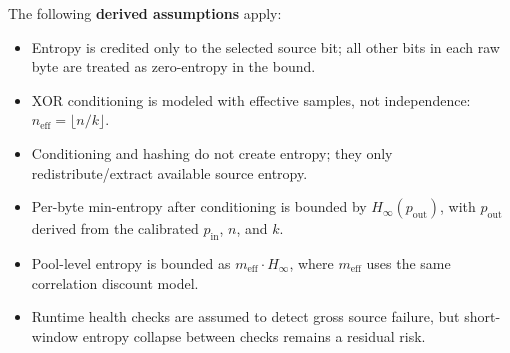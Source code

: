 \documentclass[titlepage]{report}
\begin{document}
		The following \textbf{derived assumptions} apply:
		\begin{itemize}
			\item Entropy is credited only to the selected source bit; all other bits in each raw byte are treated as zero-entropy in the bound.
			\item XOR conditioning is modeled with effective samples, not independence: \(n_{\mathrm{eff}}=\lfloor n/k \rfloor\).
			\item Conditioning and hashing do not create entropy; they only redistribute/extract available source entropy.
			\item Per-byte min-entropy after conditioning is bounded by \(H_\infty(p_{\mathrm{out}})\), with \(p_{\mathrm{out}}\) derived from the calibrated \(p_{\mathrm{in}}\), \(n\), and \(k\).
			\item Pool-level entropy is bounded as \(m_{\mathrm{eff}} \cdot H_\infty\), where \(m_{\mathrm{eff}}\) uses the same correlation discount model.
			\item Runtime health checks are assumed to detect gross source failure, but short-window entropy collapse between checks remains a residual risk.
		\end{itemize}
		
\end{document}
